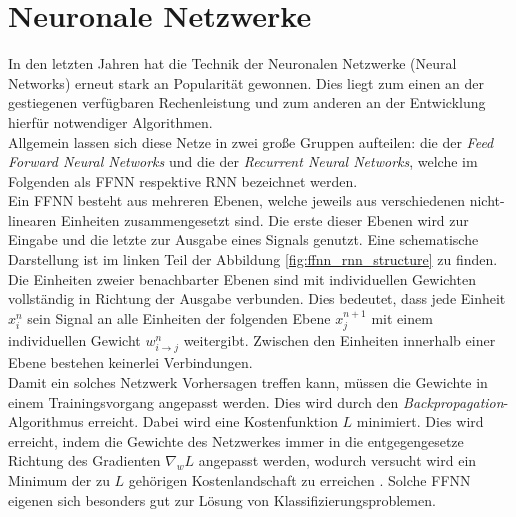 \section{Neuronale Netzwerke}
In den letzten Jahren hat die Technik der Neuronalen Netzwerke (Neural Networks) erneut stark an Popularität gewonnen. Dies liegt zum einen an der gestiegenen verfügbaren Rechenleistung und zum anderen an der Entwicklung hierfür notwendiger Algorithmen.\\
Allgemein lassen sich diese Netze in zwei große Gruppen aufteilen: die der \textit{Feed Forward Neural Networks} und die der \textit{Recurrent Neural Networks}, welche im Folgenden als \textsc{FFNN} respektive \textsc{RNN} bezeichnet werden.\\

Ein \textsc{FFNN} besteht aus mehreren Ebenen, welche jeweils aus verschiedenen nicht-linearen Einheiten zusammengesetzt sind. Die erste dieser Ebenen wird zur Eingabe und die letzte zur Ausgabe eines Signals genutzt. Eine schematische Darstellung ist im linken Teil der Abbildung \ref{fig:ffnn_rnn_structure} zu finden. Die Einheiten zweier benachbarter Ebenen sind mit individuellen Gewichten vollständig in Richtung der Ausgabe verbunden. Dies bedeutet, dass jede Einheit $x^n_i$ sein Signal an alle Einheiten der folgenden Ebene $x^{n+1}_j$ mit einem individuellen Gewicht $w^n_{i \rightarrow j}$ weitergibt. Zwischen den Einheiten innerhalb einer Ebene bestehen keinerlei Verbindungen.\\
Damit ein solches Netzwerk Vorhersagen treffen kann, müssen die Gewichte in einem Trainingsvorgang angepasst werden. Dies wird durch den \textit{Backpropagation}-Algorithmus erreicht. Dabei wird eine Kostenfunktion $L$ minimiert. Dies wird erreicht, indem die Gewichte des Netzwerkes immer in die entgegengesetze Richtung des Gradienten $\nabla_w L$ angepasst werden, wodurch versucht wird ein Minimum der zu $L$ gehörigen Kostenlandschaft zu erreichen \cite[S. 225-290]{bishop}. Solche \textsc{FFNN} eigenen sich besonders gut zur Lösung von Klassifizierungsproblemen.\\

